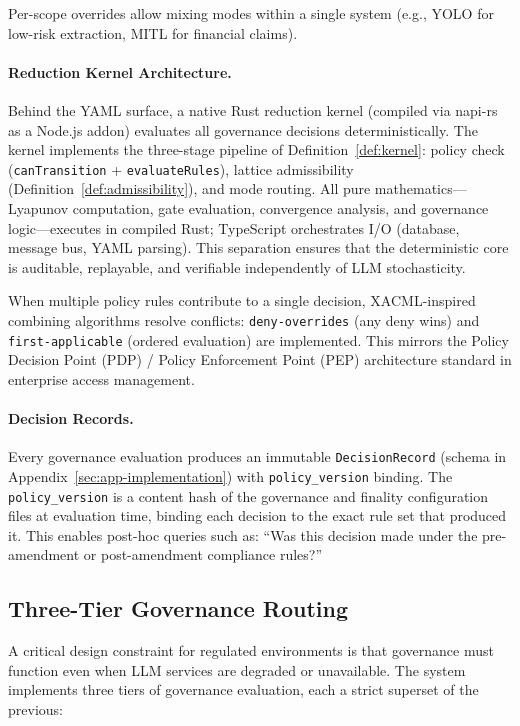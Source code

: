 \documentclass[11pt]{article}
\begin{document}
Per-scope overrides allow mixing modes within a single system (e.g., YOLO for low-risk extraction, MITL for financial claims).

\paragraph{Reduction Kernel Architecture.}
Behind the YAML surface, a native Rust reduction kernel (compiled via napi-rs as a Node.js addon) evaluates all governance decisions deterministically. The kernel implements the three-stage pipeline of Definition~\ref{def:kernel}: policy check (\texttt{canTransition} + \texttt{evaluateRules}), lattice admissibility (Definition~\ref{def:admissibility}), and mode routing. All pure mathematics---Lyapunov computation, gate evaluation, convergence analysis, and governance logic---executes in compiled Rust; TypeScript orchestrates I/O (database, message bus, YAML parsing). This separation ensures that the deterministic core is auditable, replayable, and verifiable independently of LLM stochasticity.

When multiple policy rules contribute to a single decision, XACML-inspired combining algorithms \cite{xacml2013} resolve conflicts: \texttt{deny-overrides} (any deny wins) and \texttt{first-applicable} (ordered evaluation) are implemented. This mirrors the Policy Decision Point (PDP) / Policy Enforcement Point (PEP) architecture standard in enterprise access management.

\paragraph{Decision Records.}
Every governance evaluation produces an immutable \texttt{DecisionRecord} (schema in Appendix~\ref{sec:app-implementation}) with \texttt{policy\_version} binding. The \texttt{policy\_version} is a content hash of the governance and finality configuration files at evaluation time, binding each decision to the exact rule set that produced it. This enables post-hoc queries such as: ``Was this decision made under the pre-amendment or post-amendment compliance rules?''

\subsection{Three-Tier Governance Routing}
\label{sec:three-tier}

A critical design constraint for regulated environments is that governance must function even when LLM services are degraded or unavailable. The system implements three tiers of governance evaluation, each a strict superset of the previous:
\end{document}

